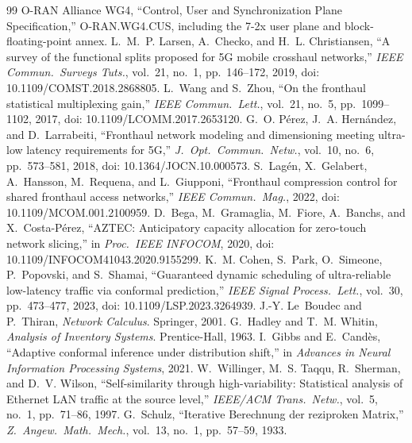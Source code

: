 \documentclass[11pt,a4paper]{article}
\begin{document}
\enlargethispage{2\baselineskip}
\begin{thebibliography}{99}
O-RAN Alliance WG4, ``Control, User and Synchronization Plane Specification,'' O-RAN.WG4.CUS, including the 7-2x user plane and block-floating-point annex.
L.~M.~P. Larsen, A.~Checko, and H.~L. Christiansen, ``A survey of the functional splits proposed for 5G mobile crosshaul networks,'' \emph{IEEE Commun.\ Surveys Tuts.}, vol.~21, no.~1, pp.~146--172, 2019, doi: 10.1109/COMST.2018.2868805.
L.~Wang and S.~Zhou, ``On the fronthaul statistical multiplexing gain,'' \emph{IEEE Commun.\ Lett.}, vol.~21, no.~5, pp.~1099--1102, 2017, doi: 10.1109/LCOMM.2017.2653120.
G.~O. P\'erez, J.~A. Hern\'andez, and D.~Larrabeiti, ``Fronthaul network modeling and dimensioning meeting ultra-low latency requirements for 5G,'' \emph{J.\ Opt.\ Commun.\ Netw.}, vol.~10, no.~6, pp.~573--581, 2018, doi: 10.1364/JOCN.10.000573.
S.~Lag\'en, X.~Gelabert, A.~Hansson, M.~Requena, and L.~Giupponi, ``Fronthaul compression control for shared fronthaul access networks,'' \emph{IEEE Commun.\ Mag.}, 2022, doi: 10.1109/MCOM.001.2100959.
D.~Bega, M.~Gramaglia, M.~Fiore, A.~Banchs, and X.~Costa-P\'erez, ``AZTEC: Anticipatory capacity allocation for zero-touch network slicing,'' in \emph{Proc.\ IEEE INFOCOM}, 2020, doi: 10.1109/INFOCOM41043.2020.9155299.
K.~M. Cohen, S.~Park, O.~Simeone, P.~Popovski, and S.~Shamai, ``Guaranteed dynamic scheduling of ultra-reliable low-latency traffic via conformal prediction,'' \emph{IEEE Signal Process.\ Lett.}, vol.~30, pp.~473--477, 2023, doi: 10.1109/LSP.2023.3264939.
J.-Y. Le~Boudec and P.~Thiran, \emph{Network Calculus}. Springer, 2001.
G.~Hadley and T.~M. Whitin, \emph{Analysis of Inventory Systems}. Prentice-Hall, 1963.
I.~Gibbs and E.~Cand\`es, ``Adaptive conformal inference under distribution shift,'' in \emph{Advances in Neural Information Processing Systems}, 2021.
W.~Willinger, M.~S. Taqqu, R.~Sherman, and D.~V. Wilson, ``Self-similarity through high-variability: Statistical analysis of Ethernet LAN traffic at the source level,'' \emph{IEEE/ACM Trans.\ Netw.}, vol.~5, no.~1, pp.~71--86, 1997.
G.~Schulz, ``Iterative Berechnung der reziproken Matrix,'' \emph{Z.\ Angew.\ Math.\ Mech.}, vol.~13, no.~1, pp.~57--59, 1933.
\end{thebibliography}
\end{document}

